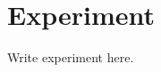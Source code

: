 \documentclass[a4paper,11pt,oneside,openany,fleqn]{jsbook}
\begin{document}
    \chapter{Experiment}
        Write experiment here.
\end{document}
